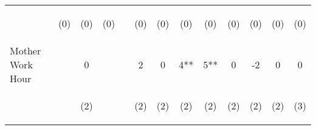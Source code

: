 \begin{tabular}{lcccccccccccc}
 & \begin{footnotesize}(0)\end{footnotesize} & \begin{footnotesize}(0)\end{footnotesize} & \begin{footnotesize}(0)\end{footnotesize} & \begin{footnotesize}\end{footnotesize} & \begin{footnotesize}(0)\end{footnotesize} & \begin{footnotesize}(0)\end{footnotesize} & \begin{footnotesize}(0)\end{footnotesize} & \begin{footnotesize}(0)\end{footnotesize} & \begin{footnotesize}(0)\end{footnotesize} & \begin{footnotesize}(0)\end{footnotesize} & \begin{footnotesize}(0)\end{footnotesize} & \begin{footnotesize}(0)\end{footnotesize}\\
\noalign{\smallskip}Mother Work Hour &  & 0 &  &  & 2 & 0 & 4** & 5** & 0 & -2 & 0 & 0\\
 & \begin{footnotesize}\end{footnotesize} & \begin{footnotesize}(2)\end{footnotesize} & \begin{footnotesize}\end{footnotesize} & \begin{footnotesize}\end{footnotesize} & \begin{footnotesize}(2)\end{footnotesize} & \begin{footnotesize}(2)\end{footnotesize} & \begin{footnotesize}(2)\end{footnotesize} & \begin{footnotesize}(2)\end{footnotesize} & \begin{footnotesize}(2)\end{footnotesize} & \begin{footnotesize}(2)\end{footnotesize} & \begin{footnotesize}(2)\end{footnotesize} & \begin{footnotesize}(3)\end{footnotesize}\\

\end{tabular}

